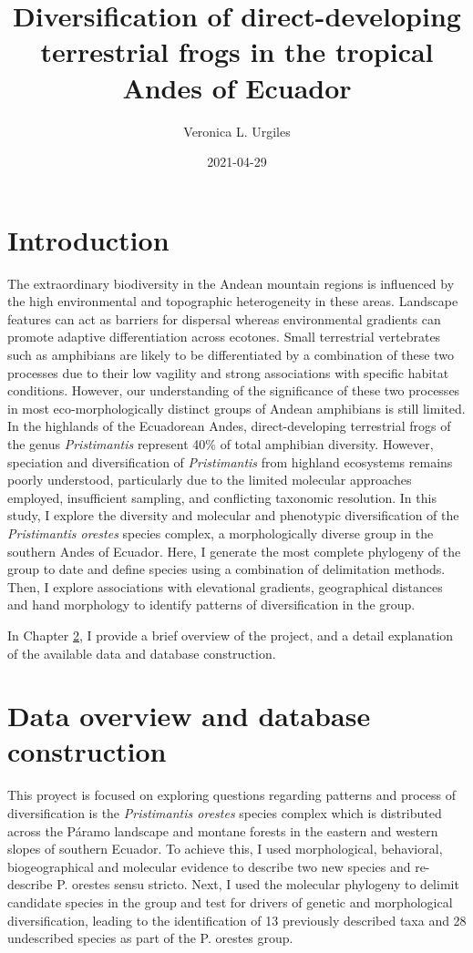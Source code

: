 \documentclass[
]{book}
\title{Diversification of direct-developing terrestrial frogs in the tropical Andes of Ecuador}
\author{Veronica L. Urgiles}
\date{2021-04-29}
\begin{document}
\maketitle

{
\setcounter{tocdepth}{1}
\tableofcontents
}
\hypertarget{introduction}{%
\chapter{Introduction}\label{introduction}}

The extraordinary biodiversity in the Andean mountain regions is influenced by the high environmental and topographic heterogeneity in these areas. Landscape features can act as barriers for dispersal whereas environmental gradients can promote adaptive differentiation across ecotones. Small terrestrial vertebrates such as amphibians are likely to be differentiated by a combination of these two processes due to their low vagility and strong associations with specific habitat conditions. However, our understanding of the significance of these two processes in most eco-morphologically distinct groups of Andean amphibians is still limited. In the highlands of the Ecuadorean Andes, direct-developing terrestrial frogs of the genus \emph{Pristimantis} represent 40\% of total amphibian diversity. However, speciation and diversification of \emph{Pristimantis} from highland ecosystems remains poorly understood, particularly due to the limited molecular approaches employed, insufficient sampling, and conflicting taxonomic resolution. In this study, I explore the diversity and molecular and phenotypic diversification of the \emph{Pristimantis orestes} species complex, a morphologically diverse group in the southern Andes of Ecuador. Here, I generate the most complete phylogeny of the group to date and define species using a combination of delimitation methods. Then, I explore associations with elevational gradients, geographical distances and hand morphology to identify patterns of diversification in the group.

In Chapter \ref{pristis}, I provide a brief overview of the project, and a detail explanation of the available data and database construction.

\hypertarget{pristis}{%
\chapter{Data overview and database construction}\label{pristis}}

This proyect is focused on exploring questions regarding patterns and process of diversification is the \emph{Pristimantis orestes} species complex which is distributed across the Páramo landscape and montane forests in the eastern and western slopes of southern Ecuador. To achieve this, I used morphological, behavioral, biogeographical and molecular evidence to describe two new species and re-describe P. orestes sensu stricto. Next, I used the molecular phylogeny to delimit candidate species in the group and test for drivers of genetic and morphological diversification, leading to the identification of 13 previously described taxa and 28 undescribed species as part of the P. orestes group.
\end{document}
